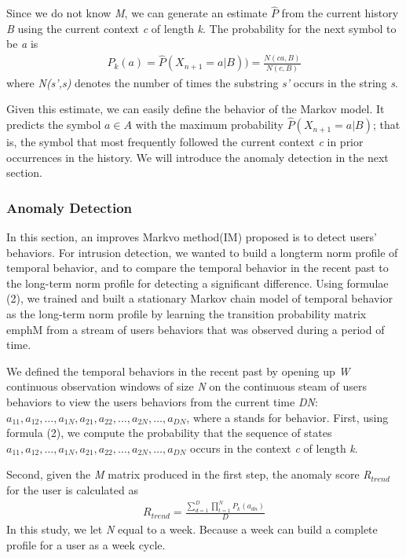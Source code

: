 \documentclass[conference]{IEEEtran}
\begin{document}
Since we do not know \emph{M}, we can generate an estimate \emph{$\hat P$} from the current history \emph{B} using the current context \emph{c} of length \emph{k}. The probability for the next symbol to be \emph{a} is
\begin{align}
	P_k(a)=\hat P(X_{n+1}=a|B))= \frac {N(ca,B)}{N(c,B)}
\end{align}
where \emph{N(s',s)} denotes the number of times the substring \emph{s'} occurs in the string \emph{s}.

Given this estimate, we can easily define the behavior of the Markov model. It predicts the symbol \emph{$a \in A$} with the maximum probability \emph{$\hat P(X_{n+1}=a|B)$}; that is, the symbol that most frequently followed the current context \emph{c} in prior occurrences in the history. We will introduce the anomaly detection in the next section.


\subsubsection{Anomaly Detection}
In this section, an improves Markvo method(IM) proposed is to detect users' behaviors. For intrusion detection, we wanted to build a longterm norm profile of temporal behavior, and to
compare the temporal behavior in the recent past to the long-term norm profile for detecting a significant difference. Using formulae (2), we trained and built a stationary Markov chain model  of temporal behavior as the long-term norm profile by learning the transition probability matrix emph{M} from a stream of users behaviors that was observed during a period of time.

We defined the temporal behaviors in the recent past by opening up \emph{W} continuous observation windows of size \emph{N} on the continuous steam of users behaviors to view the users behaviors from the current time \emph{DN}:
\emph{$a_{11},a_{12},\dots,a_{1N},a_{21},a_{22},\dots,a_{2N},\dots,a_{DN}$}, where a stands for behavior. First, using formula (2), we compute the probability that the sequence of states \emph{$a_{11},a_{12},\dots,a_{1N},a_{21},a_{22},\dots,a_{2N},\dots,a_{DN}$} occurs in the context \emph{c} of length \emph{k}.

Second, given the \emph{M} matrix produced in the first step, the anomaly score \emph{R$_{trend}$} for the user is calculated as
\begin{align}
R_{trend}=\frac{\sum_{d=1}^D \prod_{t=1}^N P_k(a_{dn})}{D}
\end{align}
In this study, we let \emph{N} equal to a week. Because a week can build a complete profile for a user as a week cycle.
\end{document}
